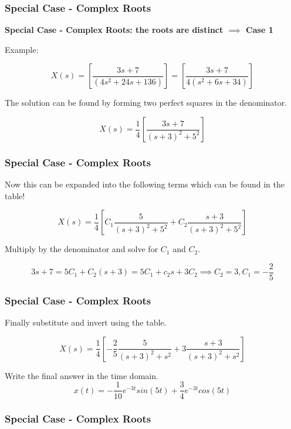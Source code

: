 \documentclass[fleqn]{beamer} %
\newcommand{\sectionIIIsubsectionIVtitle}{Special Case - Complex Roots}
\begin{document}
			\begin{frame}
				\frametitle{\sectionIIIsubsectionIVtitle}
				\bigskip

				\textbf{Special Case - Complex Roots: the roots are distinct $\implies$ Case 1} 

				Example:

				\[ X(s)=\left[ \frac{3s+7}{\left(4s^2+24s+136\right)} \right]=\left[ \frac{3s+7}{4\left(s^2+6s+34\right)} \right] \]

				The solution can be found by forming two perfect squares in the denominator.

				\[ X(s)=\frac{1}{4} \left[ \frac{3s+7}{\left(s+3\right)^2+5^2}\right] \]

				\btVFill 
			\end{frame}

			\begin{frame}
				\frametitle{\sectionIIIsubsectionIVtitle}
				\bigskip

				Now this can be expanded into the following terms which can be found in the table!

				\[ X(s)=\frac{1}{4}  \left[ C_1 \frac{5}{\left(s+3\right)^2+5^2} +C_2 \frac{s+3}{\left(s+3\right)^2+5^2}\right] \]

				Multiply by the denominator and solve for $C_1$ and $C_2$.

				\[ 3s+7 = 5C_1 +C_2\left( s+3\right) = 5C_1 +c_2s+3C_2 \implies C_2=3, C_1 = -\frac{2}{5} \]

		 		\btVFill 
			\end{frame}
			
			\begin{frame}
				\frametitle{\sectionIIIsubsectionIVtitle}
				\bigskip
				
				Finally substitute and invert using the table. 

				\[ X(s)=\frac{1}{4}  \left[-\frac{2}{5}\frac{5}{\left(s+3\right)^2+s^2} +3 \frac{s+3}{\left(s+3\right)^2+s^2}\right] \] 

				Write the final answer in the time domain.
				\[ x(t) =-\frac{1}{10}e^{-3t}sin\left(5t\right)+\frac{3}{4}e^{-3t}cos\left(5t\right) \]
					
				\btVFill 
			\end{frame}

			\begin{frame}
				\frametitle{\sectionIIIsubsectionIVtitle}
				\bigskip
			
				
				\btVFill 
			\end{frame}
\end{document}
